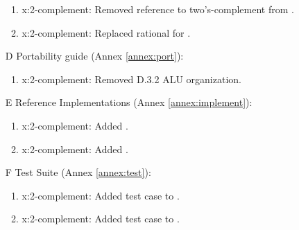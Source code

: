 \begin{itemize}
\begin{enumerate}
		\item \textsf{x:2-complement}: Removed reference
			to two's-complement from .

		\item \textsf{x:2-complement}:
			Replaced rational for .
		\end{enumerate}

	\item[D] Portability guide (Annex \ref{annex:port}):				%
		\begin{enumerate}
		\item \textsf{x:2-complement}: Removed D.3.2 ALU organization.
		\end{enumerate}

	\item[E] Reference Implementations (Annex \ref{annex:implement}):	%
		\begin{enumerate}

		\item \textsf{x:2-complement}: Added .

		\item \textsf{x:2-complement}: Added .
		\end{enumerate}

	\item[F] Test Suite (Annex \ref{annex:test}):						%
		\begin{enumerate}
		\item \textsf{x:2-complement}: Added test case to .
		\item \textsf{x:2-complement}: Added test case to .
		\end{enumerate}
	\end{itemize}


